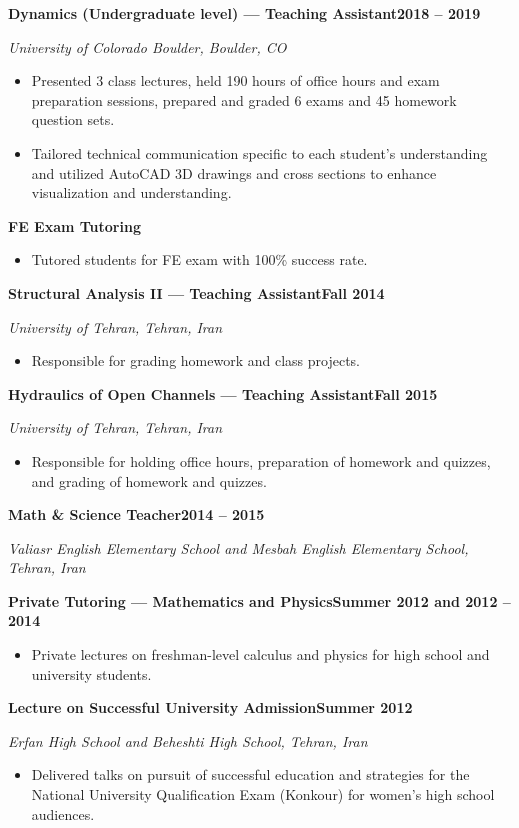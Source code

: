 \documentclass[10pt, letterpaper]{article}
\newcommand{\jobline}[2]{%
  \vspace{5pt}%
  \noindent\textbf{#1}\hfill\textbf{#2}\par%
  \vspace{1pt}%
}
\newcommand{\subline}[1]{%
  \vspace{-1pt}%
  \noindent\textit{#1}\par%
  \vspace{1pt}%
}
\newenvironment{rlist}{%
  \begin{itemize}[leftmargin=1.4em, itemsep=1pt, topsep=2pt, parsep=0pt]%
}{%
  \end{itemize}%
}
\begin{document}
\jobline{Dynamics (Undergraduate level) --- Teaching Assistant}{2018 -- 2019}
\subline{University of Colorado Boulder, Boulder, CO}
\begin{rlist}
  \item Presented 3 class lectures, held 190 hours of office hours and exam preparation sessions, prepared and graded 6 exams and 45 homework question sets.
  \item Tailored technical communication specific to each student's understanding and utilized AutoCAD 3D drawings and cross sections to enhance visualization and understanding.
\end{rlist}

\jobline{FE Exam Tutoring}{}
\begin{rlist}
  \item Tutored students for FE exam with 100\% success rate.
\end{rlist}

\vspace{4pt}
\jobline{Structural Analysis II --- Teaching Assistant}{Fall 2014}
\subline{University of Tehran, Tehran, Iran}
\begin{rlist}
  \item Responsible for grading homework and class projects.
\end{rlist}

\jobline{Hydraulics of Open Channels --- Teaching Assistant}{Fall 2015}
\subline{University of Tehran, Tehran, Iran}
\begin{rlist}
  \item Responsible for holding office hours, preparation of homework and quizzes, and grading of homework and quizzes.
\end{rlist}

\vspace{6pt}
\jobline{Math \& Science Teacher}{2014 -- 2015}
\subline{Valiasr English Elementary School and Mesbah English Elementary School, Tehran, Iran}

\vspace{6pt}
\jobline{Private Tutoring --- Mathematics and Physics}{Summer 2012 and 2012 -- 2014}
\begin{rlist}
  \item Private lectures on freshman-level calculus and physics for high school and university students.
\end{rlist}

\jobline{Lecture on Successful University Admission}{Summer 2012}
\subline{Erfan High School and Beheshti High School, Tehran, Iran}
\begin{rlist}
  \item Delivered talks on pursuit of successful education and strategies for the National University Qualification Exam (Konkour) for women's high school audiences.
\end{rlist}
\end{document}
